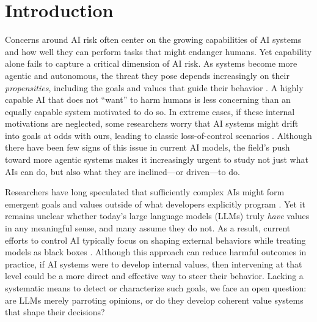 

\section{Introduction}
Concerns around AI risk often center on the growing capabilities of AI systems and how well they can perform tasks that might endanger humans. Yet capability alone fails to capture a critical dimension of AI risk. As systems become more agentic and autonomous, the threat they pose depends increasingly on their \emph{propensities}, including the goals and values that guide their behavior \citep{pan2023rewardsjustifymeansmeasuring, hendrycks2022jiminycricketdoagents}. A highly capable AI that does not ``want'' to harm humans is less concerning than an equally capable system motivated to do so. In extreme cases, if these internal motivations are neglected, some researchers worry that AI systems might drift into goals at odds with ours, leading to classic loss-of-control scenarios \citep{soares2015corrigibility, hendrycks2023overviewcatastrophicairisks}. Although there have been few signs of this issue in current AI models, the field’s push toward more agentic systems \citep{yao2022react, yang2024sweagentagentcomputerinterfacesenable, he2024webvoyagerbuildingendtoendweb} makes it increasingly urgent to study not just what AIs can do, but also what they are inclined—or driven—to do.

Researchers have long speculated that sufficiently complex AIs might form emergent goals and values outside of what developers explicitly program \citep{hendrycks2022unsolvedproblemsmlsafety, hendrycks2023natural, evans2021truthfulaidevelopinggoverning}. Yet it remains unclear whether today’s large language models (LLMs) truly \emph{have} values in any meaningful sense, and many assume they do not. As a result, current efforts to control AI typically focus on shaping external behaviors while treating models as black boxes \citep{askell2021generallanguageassistantlaboratory, ouyang2022training, christiano2017deep, bai2022traininghelpfulharmlessassistant}. Although this approach can reduce harmful outcomes in practice, if AI systems were to develop internal values, then intervening at that level could be a more direct and effective way to steer their behavior. Lacking a systematic means to detect or characterize such goals, we face an open question: are LLMs merely parroting opinions, or do they develop coherent value systems that shape their decisions?





